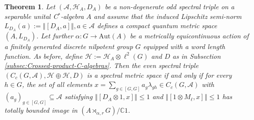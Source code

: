 \documentclass[a4paper,11pt,reqno]{amsart}
\numberwithin{equation}{section}
\numberwithin{equation}{section}
\newtheorem{theorem}{Theorem}[section]
\theoremstyle{definition}
\theoremstyle{remark}
\theoremstyle{remark}
\begin{document}
\begin{theorem} \label{NilpotentTheorem} Let $(\mathcal{A},\mathcal{H}_{A},D_{A})$
be a non-degenerate odd spectral triple on a separable unital C$^{\ast}$-algebra
$A$ and assume that the induced Lipschitz semi-norm $L_{D_{A}}(a):=\left\Vert [D_{A},a]\right\Vert ,a\in\mathcal{A}$
defines a compact quantum metric space $(A,L_{D_{A}})$. Let further
$\alpha:G\rightarrow\text{Aut}(A)$ be a metrically equicontinuous
action of a finitely generated discrete nilpotent group $G$ equipped
with a word length function. As before, define $\mathcal{H}:=\mathcal{H}_{A}\otimes\ell^{2}(G)$
and $D$ as in Subsection \ref{subsec:Crossed-product-C-algebras}.
Then the even spectral triple $(C_{c}(G,\mathcal{A}),\mathcal{H}\oplus\mathcal{H},D)$
is a spectral metric space if and only if for every $h\in G$,
the set of all elements $x=\sum_{g\in[G,G]}a_{g}\lambda_{gh}\in C_{c}(G,\mathcal{A})$
with $(a_{g})_{g\in[G,G]}\subseteq\mathcal{A}$ satisfying $\left\Vert [D_{A}\otimes1,x]\right\Vert \leq1$
and $\left\Vert [1\otimes M_{\ell},x]\right\Vert \leq1$ has totally
bounded image in $(A\rtimes_{\alpha,r}G)/\mathbb{C}1$. \end{theorem}
\end{document}
